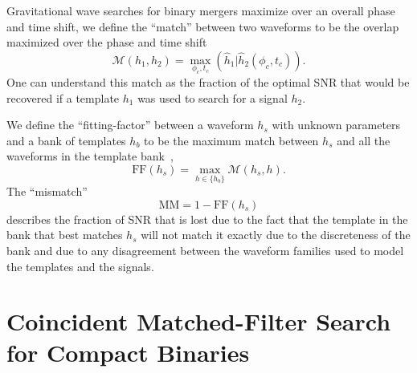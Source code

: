 Gravitational wave searches for binary mergers maximize over an
overall phase and time shift, we define the ``match'' between two waveforms
to be the overlap maximized over the phase and time shift
%
\begin{equation}
\label{eq:match}
\mathcal{M}(h_1,h_2) =
\underset{\phi_c,t_c}{\max}(\hat{h}_1|\hat{h}_2(\phi_c,t_c)).
\end{equation}
%
One can understand this match as the fraction of the optimal \ac{SNR} that would
be recovered if a template $h_1$ was used to search for a signal $h_2$.

We define the ``fitting-factor'' between a waveform $h_s$ with unknown
parameters
and a bank of templates $h_b$ to be the maximum match between $h_s$ and all the
waveforms in the template bank~\cite{Apostolatos:1995pj},
%
\begin{equation}
\mathrm{FF}(h_s) = \max_{h \in \{h_b\}} \mathcal{M}(h_s,h).
\end{equation}
%
The ``mismatch''
%
\begin{equation}
\mathrm{MM} = 1 - \mathrm{FF}(h_s)
\end{equation}
%
describes the fraction of \ac{SNR} that is lost due to the fact that the
template in the bank that best matches $h_s$ will not match it exactly due to
the discreteness of the bank and due to any disagreement between the waveform 
families used to model the templates and the signals. 

\section{Coincident Matched-Filter Search for Compact Binaries}
\label{p:search}

